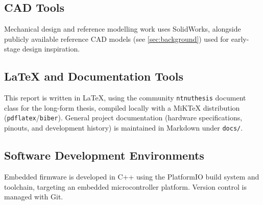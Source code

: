 \subsection{CAD Tools}

Mechanical design and reference modelling work uses SolidWorks, alongside
publicly available reference CAD models (see \cref{sec:background}) used
for early-stage design inspiration.

\subsection{LaTeX and Documentation Tools}

This report is written in \LaTeX{}, using the community \texttt{ntnuthesis}
document class for the long-form thesis, compiled locally with a MiKTeX
distribution (\texttt{pdflatex}/\texttt{biber}). General project
documentation (hardware specifications, pinouts, and development history)
is maintained in Markdown under \texttt{docs/}.

\subsection{Software Development Environments}

Embedded firmware is developed in C++ using the PlatformIO build system
and toolchain, targeting an embedded microcontroller platform. Version
control is managed with Git.
